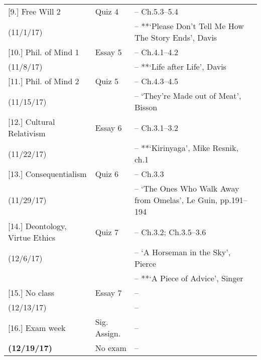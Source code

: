 \documentclass[article,oneside]{memoir}
\begin{document}
\begin{center}
\begin{longtable}{p{4.5cm}p{2cm}>{-- }p{6cm}}
[9.] Free Will 2 				& Quiz 4			&  Ch.5.3--5.4\\
(11/1/17)					&				& **`Please Don't Tell Me How The Story Ends', Davis \\  [1.8\baselineskip]

[10.] Phil. of Mind 1			& Essay 5				& Ch.4.1--4.2 \\
(11/8/17)					&					& **`Life after Life', Davis\\ [1.8\baselineskip]
						
[11.] Phil. of Mind 2 			& Quiz 5				& Ch.4.3--4.5 \\
(11/15/17)					&					& `They're Made out of Meat', Bisson \\ [1.8\baselineskip]
 

[12.] Cultural Relativism 		& Essay 6				& Ch.3.1--3.2\\
(11/22/17)					&					& **`Kirinyaga', Mike Resnik, ch.1 \\ [1.8\baselineskip]


[13.] Consequentialism 		& Quiz 6				&  Ch.3.3 \\ 
(11/29/17)					&					& `The Ones Who Walk Away from Omelas', Le Guin, pp.191--194 \\ [1.8\baselineskip]
						
[14.] Deontology, Virtue Ethics 	& Quiz 7				&  Ch.3.2;  Ch.3.5--3.6\\
(12/6/17)					&					&  `A Horseman in the Sky', Pierce \\ 
 				 		&					&  **`A Piece of Advice', Singer \\  [1.8\baselineskip]

[15.] No class				& Essay 7				&  \\ 
(12/13/17)					&					& \\  [1.8\baselineskip]

[16.] Exam week			& Sig. Assign.		&  \\ 
\textbf{(12/19/17)}			& No exam	& \\  [1.8\baselineskip]



\end{longtable}
\end{center}



\end{document}

